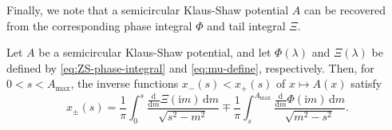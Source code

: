 \documentclass[12pt]{amsart}
\numberwithin{equation}{section}
\newcommand{\dd}{\mathrm{d}}
\newcommand{\ii}{\mathrm{i}}
\newcommand{\phaseint}{\Phi}
\newcommand{\tailint}{\Xi}
\begin{document}
Finally, we note that a semicircular Klaus-Shaw potential $A$ can be recovered from the corresponding phase integral $\phaseint$ and tail integral $\tailint$.
\begin{prop}
Let $A$ be a semicircular Klaus-Shaw potential, and let $\phaseint(\lambda)$ and $\tailint(\lambda)$ be defined by \eqref{eq:ZS-phase-integral} and \eqref{eq:mu-define}, respectively. Then, for $0<s<A_\mathrm{max}$, the inverse functions $x_-(s)<x_+(s)$ of $x\mapsto A(x)$ satisfy
\begin{equation}
x_\pm(s)=\frac{1}{\pi}\int_0^s\frac{\displaystyle\frac{\dd}{\dd m}\tailint(\ii m)\,\dd m}{\sqrt{s^2-m^2}}\mp\frac{1}{\pi}\int_s^{A_\mathrm{max}}\frac{\displaystyle\frac{\dd}{\dd m}\phaseint(\ii m)\,\dd m}{\sqrt{m^2-s^2}}.
\label{eq:xpm-recover}
\end{equation}
\label{prop:Psi-mu-invert}
\end{prop}
\end{document}
